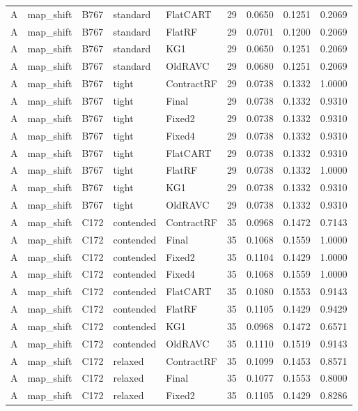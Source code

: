 \begin{longtable}{@{}lllllllll@{}}
A & map\_shift & B767 & standard & FlatCART & 29 & 0.0650 & 0.1251 & 0.2069\\
A & map\_shift & B767 & standard & FlatRF & 29 & 0.0701 & 0.1200 & 0.2069\\
A & map\_shift & B767 & standard & KG1 & 29 & 0.0650 & 0.1251 & 0.2069\\
A & map\_shift & B767 & standard & OldRAVC & 29 & 0.0680 & 0.1251 & 0.2069\\
A & map\_shift & B767 & tight & ContractRF & 29 & 0.0738 & 0.1332 & 1.0000\\
A & map\_shift & B767 & tight & Final & 29 & 0.0738 & 0.1332 & 0.9310\\
A & map\_shift & B767 & tight & Fixed2 & 29 & 0.0738 & 0.1332 & 0.9310\\
A & map\_shift & B767 & tight & Fixed4 & 29 & 0.0738 & 0.1332 & 0.9310\\
A & map\_shift & B767 & tight & FlatCART & 29 & 0.0738 & 0.1332 & 0.9310\\
A & map\_shift & B767 & tight & FlatRF & 29 & 0.0738 & 0.1332 & 1.0000\\
A & map\_shift & B767 & tight & KG1 & 29 & 0.0738 & 0.1332 & 0.9310\\
A & map\_shift & B767 & tight & OldRAVC & 29 & 0.0738 & 0.1332 & 0.9310\\
A & map\_shift & C172 & contended & ContractRF & 35 & 0.0968 & 0.1472 & 0.7143\\
A & map\_shift & C172 & contended & Final & 35 & 0.1068 & 0.1559 & 1.0000\\
A & map\_shift & C172 & contended & Fixed2 & 35 & 0.1104 & 0.1429 & 1.0000\\
A & map\_shift & C172 & contended & Fixed4 & 35 & 0.1068 & 0.1559 & 1.0000\\
A & map\_shift & C172 & contended & FlatCART & 35 & 0.1080 & 0.1553 & 0.9143\\
A & map\_shift & C172 & contended & FlatRF & 35 & 0.1105 & 0.1429 & 0.9429\\
A & map\_shift & C172 & contended & KG1 & 35 & 0.0968 & 0.1472 & 0.6571\\
A & map\_shift & C172 & contended & OldRAVC & 35 & 0.1110 & 0.1519 & 0.9143\\
A & map\_shift & C172 & relaxed & ContractRF & 35 & 0.1099 & 0.1453 & 0.8571\\
A & map\_shift & C172 & relaxed & Final & 35 & 0.1077 & 0.1553 & 0.8000\\
A & map\_shift & C172 & relaxed & Fixed2 & 35 & 0.1105 & 0.1429 & 0.8286\\

\end{longtable}
